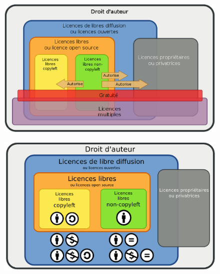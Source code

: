         \begin{figure}[!h]
            \hfill
            \begin{minipage}{0.475\linewidth}
                \centering
                 \includegraphics[width=\linewidth]{Figures/wiki-Classification_licences}
                \label{fig:class_licence_G}
            \end{minipage}
            \hfill
            \begin{minipage}{0.475\linewidth}
                \centering
                \includegraphics[width=\linewidth]{Figures/wiki-Classification_licences__CC}
                \label{fig:class_licence_CC}
            \end{minipage}
            \hfill
            \newline\strut\newline\centering
            \begin{minipage}{0.95\linewidth}

\end{minipage}
\end{figure}
